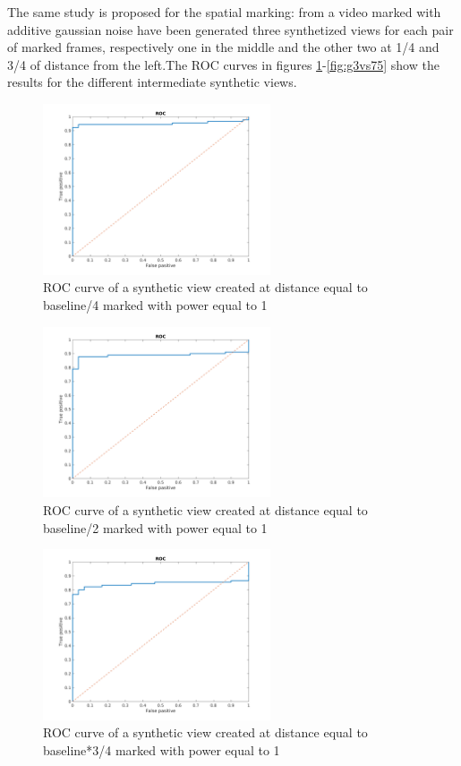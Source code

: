   
The same study is proposed for the spatial marking: from a video marked with additive gaussian noise have been generated three synthetized views for each pair of marked frames, respectively one in the middle and the other two at 1/4 and 3/4 of distance from the left.\newline The ROC curves in figures \ref{fig:g1vs25}-\ref{fig:g3vs75}  show the results for the different intermediate synthetic views.\newline 
\begin{figure}[h!]
\centering
\includegraphics[width=0.6\textwidth]{./img/ROC/ROC_gauss_synt_1_25.png}
\caption{\small{ROC curve of a synthetic view created at distance equal to baseline/4 marked with power equal to 1 }}
\label{fig:g1vs25}
\end{figure}
\begin{figure}[h!]
\centering
\includegraphics[width=0.6\textwidth]{./img/ROC/ROC_gauss_synt_1_50.png}
\caption{\small{ROC curve of a synthetic view created at distance equal to baseline/2 marked with power equal to 1 }}
\label{fig:g1vs50}
\end{figure}
\begin{figure}[h!]
\centering
\includegraphics[width=0.6\textwidth]{./img/ROC/ROC_gauss_synt_1_75.png}
\caption{\small{ROC curve of a synthetic view created at distance equal to baseline*3/4 marked with power equal to 1 }}
\label{fig:g1vs75}
\end{figure}
